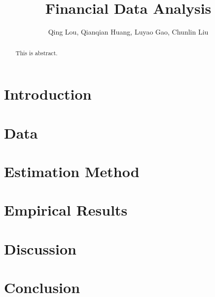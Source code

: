 \documentclass[12pt,letterpaper]{article}
\begin{document}
\title{\textbf{\Large Financial Data Analysis}}
\author{Qing Lou, Qianqian Huang, Luyao Gao, Chunlin Liu}
\date{}
\maketiitle 


\begin{abstract}
This is abstract.
\end{abstract}


\section{Introduction}

\section{Data}

\section{Estimation Method}

\section{Empirical Results}

\section{Discussion}

\section{Conclusion}
\end{document}
